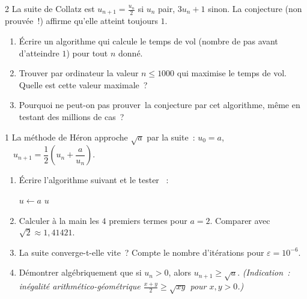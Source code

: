 \begin{probleme}{2}
La suite de Collatz est $u_{n+1} = \frac{u_n}{2}$ si $u_n$ pair,
$3u_n + 1$ sinon. La conjecture (non prouv\'ee~!) affirme qu'elle
atteint toujours $1$.
\begin{enumerate}
  \item \'Ecrire un algorithme qui calcule le temps de vol
        (nombre de pas avant d'atteindre $1$) pour tout $n$ donn\'e.
  \item Trouver par ordinateur la valeur $n \leq 1000$ qui maximise
        le temps de vol. Quelle est cette valeur maximale~?
  \item Pourquoi ne peut-on pas \og prouver\fg\ la conjecture
        par cet algorithme, m\^eme en testant des millions de cas~?
\end{enumerate}
\end{probleme}

\begin{probleme}{1}
La m\'ethode de H\'eron approche $\sqrt{a}$ par la suite~:
$u_0 = a$, $\quad u_{n+1} = \dfrac{1}{2}\!\left(u_n + \dfrac{a}{u_n}\right)$.
\begin{enumerate}
  \item \'Ecrire l'algorithme suivant et le tester \computer~:

\begin{algorithm}[H]
\caption{Approximation de $\sqrt{a}$ par la m\'ethode de H\'eron}
$u \leftarrow a$\;
\Afficher $u$\;
\end{algorithm}

  \item Calculer \`a la main les $4$ premiers termes pour $a = 2$.
        Comparer avec $\sqrt{2} \approx 1{,}41421$.
  \item La suite converge-t-elle vite~? Compte le nombre d'it\'erations
        pour $\varepsilon = 10^{-6}$.
  \item D\'emontrer alg\'ebriquement que si $u_n > 0$, alors $u_{n+1} \geq \sqrt{a}$.
        \emph{(Indication~: in\'egalit\'e arithm\'etico-g\'eom\'etrique
        $\frac{x+y}{2} \geq \sqrt{xy}$ pour $x,y>0$.)}
\end{enumerate}
\end{probleme}

